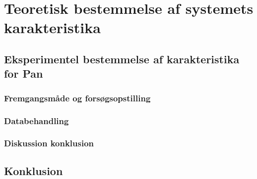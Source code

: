 \section{Teoretisk bestemmelse af systemets karakteristika}

\subsection{Eksperimentel bestemmelse af karakteristika for Pan}
\subsubsection{Fremgangsmåde og forsøgsopstilling}
\subsubsection{Databehandling}
\subsubsection{Diskussion konklusion}

\subsection{Konklusion}
